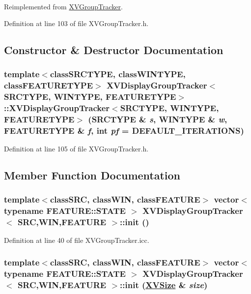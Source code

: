 Reimplemented from \hyperlink{class_XVGroupTracker}{XVGroup\-Tracker}.

Definition at line 103 of file XVGroup\-Tracker.h.

\subsection{Constructor \& Destructor Documentation}
\label{XVDisplayGroupTracker_a0}
\hypertarget{class_XVDisplayGroupTracker_a0}{
\subsubsection[XVDisplayGroupTracker]{\setlength{\rightskip}{0pt plus 5cm}template$<$classSRCTYPE, classWINTYPE, classFEATURETYPE$>$ XVDisplay\-Group\-Tracker$<$SRCTYPE, WINTYPE, FEATURETYPE$>$::XVDisplay\-Group\-Tracker$<$SRCTYPE, WINTYPE, FEATURETYPE$>$ (SRCTYPE \& {\em s}, WINTYPE \& {\em w}, FEATURETYPE \& {\em f}, int {\em pf} = DEFAULT\_\-ITERATIONS)}}




Definition at line 105 of file XVGroup\-Tracker.h.

\subsection{Member Function Documentation}
\label{XVDisplayGroupTracker_a1}
\hypertarget{class_XVDisplayGroupTracker_a1}{
\subsubsection[init]{\setlength{\rightskip}{0pt plus 5cm}template$<$classSRC, classWIN, classFEATURE$>$ vector$<$ typename FEATURE::STATE $>$ XVDisplay\-Group\-Tracker$<$ SRC,WIN,FEATURE $>$::init ()}}




Definition at line 40 of file XVGroup\-Tracker.icc.\label{XVDisplayGroupTracker_a2}
\hypertarget{class_XVDisplayGroupTracker_a2}{
\subsubsection[init]{\setlength{\rightskip}{0pt plus 5cm}template$<$classSRC, classWIN, classFEATURE$>$ vector$<$ typename FEATURE::STATE $>$ XVDisplay\-Group\-Tracker$<$ SRC,WIN,FEATURE $>$::init (\hyperlink{class_XVSize}{XVSize} \& {\em size})}}




